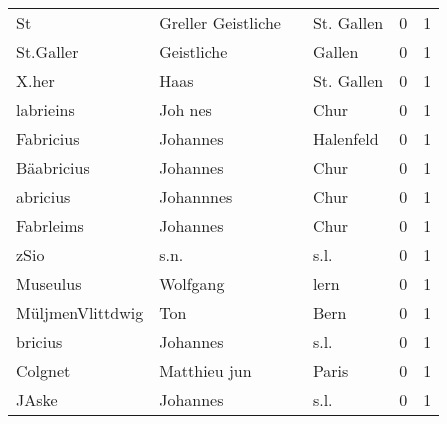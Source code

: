 \documentclass[10pt,a4paper,landscape]{article}
\begin{document}
\begin{longtable}{llllrr}
                       St &                 Greller Geistliche &             &                                  St. Gallen &          0 &         1 \\
                St.Galler &                         Geistliche &             &                                      Gallen &          0 &         1 \\
                    X.her &                               Haas &             &                                  St. Gallen &          0 &         1 \\
                labrieins &                            Joh nes &             &                                        Chur &          0 &         1 \\
                Fabricius &                           Johannes &             &                                   Halenfeld &          0 &         1 \\
               Bäabricius &                           Johannes &             &                                        Chur &          0 &         1 \\
                 abricius &                          Johannnes &             &                                        Chur &          0 &         1 \\
                Fabrleims &                           Johannes &             &                                        Chur &          0 &         1 \\
                     zSio &                               s.n. &             &                                        s.l. &          0 &         1 \\
                 Museulus &                           Wolfgang &             &                                        lern &          0 &         1 \\
         MüljmenVlittdwig &                                Ton &             &                                        Bern &          0 &         1 \\
                  bricius &                           Johannes &             &                                        s.l. &          0 &         1 \\
                  Colgnet &                       Matthieu jun &             &                                       Paris &          0 &         1 \\
                    JAske &                           Johannes &             &                                        s.l. &          0 &         1 \\

\end{longtable}
\end{document}

